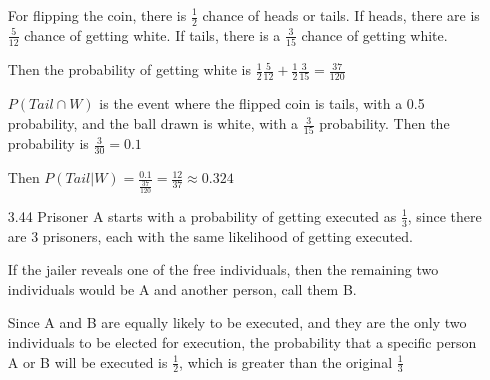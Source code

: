 \documentclass[11pt]{article}
\begin{document}
\begin{itemize}
	For flipping the coin, there is $\frac{1}{2}$ chance of heads or tails. If heads, there are is $\frac{5}{12}$ chance of getting white. If tails, there is a $\frac{3}{15}$ chance of getting white.

	Then the probability of getting white is $\frac{1}{2} \frac{5}{12} + \frac{1}{2} \frac{3}{15} = \frac{37}{120}$

	$P(Tail\cap W)$ is the event where the flipped coin is tails, with a 0.5 probability, and the ball drawn is white, with a $\frac{3}{15}$ probability. Then the probability is $\frac{3}{30} = 0.1$

	Then $P(Tail | W) = \frac{0.1}{\frac{37}{120}} = \frac{12}{37} \approx 0.324$
\item[3.44]
	Prisoner A starts with a probability of getting executed as $\frac{1}{3}$, since there are 3 prisoners, each with the same likelihood of getting executed.

	If the jailer reveals one of the free individuals, then the remaining two individuals would be A and another person, call them B. 

	Since A and B are equally likely to be executed, and they are the only two individuals to be elected for execution, the probability that a specific person A or B will be executed is $\frac{1}{2}$, which is greater than the original $\frac{1}{3}$
\end{itemize}
\end{document}
